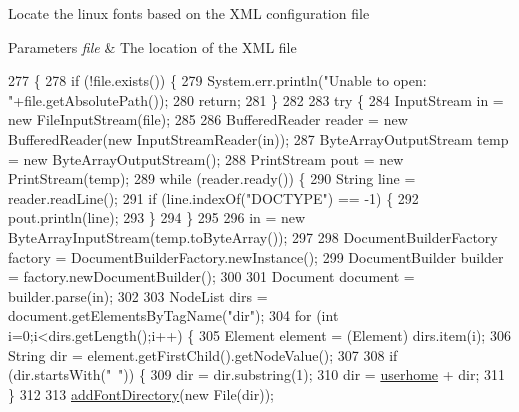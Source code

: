 Locate the linux fonts based on the X\+ML configuration file


\begin{DoxyParams}{Parameters}
{\em file} & The location of the X\+ML file \\
\hline
\end{DoxyParams}

\begin{DoxyCode}
277                                                     \{
278         \textcolor{keywordflow}{if} (!file.exists()) \{
279             System.err.println(\textcolor{stringliteral}{"Unable to open: "}+file.getAbsolutePath());
280             \textcolor{keywordflow}{return};
281         \}
282 
283         \textcolor{keywordflow}{try} \{
284             InputStream in = \textcolor{keyword}{new} FileInputStream(file);
285         
286             BufferedReader reader = \textcolor{keyword}{new} BufferedReader(\textcolor{keyword}{new} InputStreamReader(in));
287             ByteArrayOutputStream temp = \textcolor{keyword}{new} ByteArrayOutputStream();
288             PrintStream pout = \textcolor{keyword}{new} PrintStream(temp);
289             \textcolor{keywordflow}{while} (reader.ready()) \{
290                 String line = reader.readLine();
291                 \textcolor{keywordflow}{if} (line.indexOf(\textcolor{stringliteral}{"DOCTYPE"}) == -1) \{
292                     pout.println(line);
293                 \}
294             \}
295             
296             in = \textcolor{keyword}{new} ByteArrayInputStream(temp.toByteArray());
297         
298             DocumentBuilderFactory factory = DocumentBuilderFactory.newInstance();
299             DocumentBuilder builder = factory.newDocumentBuilder();
300             
301             Document document = builder.parse(in);
302             
303             NodeList dirs = document.getElementsByTagName(\textcolor{stringliteral}{"dir"});
304             \textcolor{keywordflow}{for} (\textcolor{keywordtype}{int} i=0;i<dirs.getLength();i++) \{
305                 Element element = (Element) dirs.item(i);
306                 String dir = element.getFirstChild().getNodeValue();
307                 
308                 \textcolor{keywordflow}{if} (dir.startsWith(\textcolor{stringliteral}{"~"})) \{
309                     dir = dir.substring(1);
310                     dir = \mbox{\hyperlink{classorg_1_1newdawn_1_1slick_1_1tools_1_1hiero_1_1truetype_1_1_font_data_af0be3d061e554e3951a5cb44c2a693c5}{userhome}} + dir;
311                 \}
312                 
313                 \mbox{\hyperlink{classorg_1_1newdawn_1_1slick_1_1tools_1_1hiero_1_1truetype_1_1_font_data_a32d549f946e2d1bb1405da459fdaf6ba}{addFontDirectory}}(\textcolor{keyword}{new} File(dir));

\end{DoxyCode}
